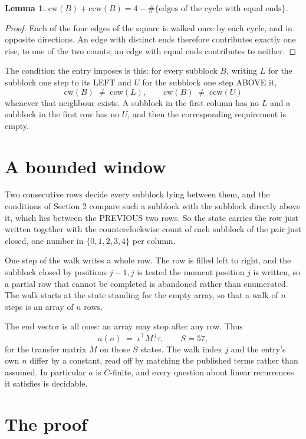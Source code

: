 \documentclass[11pt,a4paper]{article}
\theoremstyle{plain}
\newtheorem{lemma}[theorem]{Lemma}
\theoremstyle{definition}
\begin{document}
\begin{lemma}\label{lem:sum}
$\mathrm{cw}(B)+\mathrm{ccw}(B)=4-\#\{\text{edges of the cycle with equal ends}\}$.
\end{lemma}

\begin{proof}
Each of the four edges of the square is walked once by each cycle, and in opposite directions.
An edge with distinct ends therefore contributes exactly one rise, to one of the two counts;
an edge with equal ends contributes to neither.
\end{proof}

The condition the entry imposes is this: for every subblock $B$, writing $L$ for the subblock one step to its LEFT and $U$ for the subblock one step ABOVE it,
\[
\mathrm{cw}(B)\;\ne\;\mathrm{ccw}(L),\qquad \mathrm{cw}(B)\;\ne\;\mathrm{ccw}(U)
\]
whenever that neighbour exists. A subblock in the first column has no $L$ and a subblock in the first row has no $U$, and then the corresponding requirement is empty.

\section{A bounded window}

Two consecutive rows decide every subblock lying between them, and the conditions of Section 2 compare such a subblock with the subblock directly above it, which lies between the PREVIOUS two rows. So the state carries the row just written together with the counterclockwise count of each subblock of the pair just closed, one number in $\{0,1,2,3,4\}$ per column.

One step of the walk writes a whole row. The row is filled left to right, and the subblock
closed by positions $j-1,j$ is tested the moment position $j$ is written, so a partial row that
cannot be completed is abandoned rather than enumerated. The walk starts at the state standing
for the empty array, so that a walk of $n$ steps is an array of $n$ rows.

The end vector is all ones: an array may stop after any row. Thus
\[
a(n)\;=\;\iota^{\!\top}M^{\,j}\tau ,\qquad S=57,
\]
for the transfer matrix $M$ on those $S$ states. The walk index $j$ and the entry's own $n$
differ by a constant, read off by matching the published terms rather than assumed. In
particular $a$ is $C$-finite, and every question about linear recurrences it satisfies is
decidable.

\section{The proof}
\end{document}
